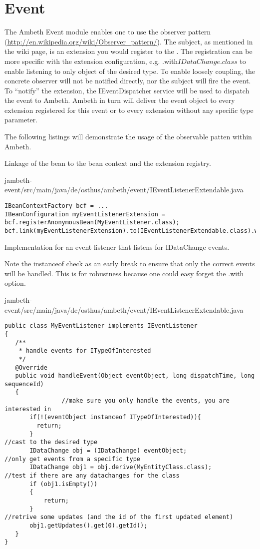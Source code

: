 \section{Event}
\label{module:Event}
\ClearAPI
\TODO
The Ambeth Event module enables one to use the observer pattern (\url{http://en.wikipedia.org/wiki/Observer_pattern/}). 
The subject, as mentioned in the wiki page, is an extension you would register to the . The registration can be more specific with the extension configuration, e.g. .with\(IDataChange.class\) to enable listening to only object of the desired type.
To enable loosely coupling, the concrete observer will not be notified directly, nor the subject will fire the event. To ``notify'' the extension, the IEventDispatcher service will be used to dispatch the event to Ambeth. Ambeth in turn will deliver the event object to every extension registered for this event or to every extension without any specific type parameter.

The following listings will demonstrate the usage of the observable patten within Ambeth.

Linkage of the bean to the bean context and the extension registry.

{jambeth-event/src/main/java/de/osthus/ambeth/event/IEventListenerExtendable.java}
\begin{lstlisting}[style=Java,caption={Example registration of an EventListener}]
IBeanContextFactory bcf = ...
IBeanConfiguration myEventListenerExtension = bcf.registerAnonymousBean(MyEventListener.class);
bcf.link(myEventListenerExtension).to(IEventListenerExtendable.class).with(IDataChange.class);
\end{lstlisting}

Implementation for an event listener that listens for IDataChange events.

Note the instanceof check as an early break to ensure that only the correct events will be handled. This is for robustness because one could easy forget the .with\(\) option.

{jambeth-event/src/main/java/de/osthus/ambeth/event/IEventListenerExtendable.java}
\begin{lstlisting}[style=Java,caption={}]
public class MyEventListener implements IEventListener
{
   /**
    * handle events for ITypeOfInterested
    */
   @Override
   public void handleEvent(Object eventObject, long dispatchTime, long sequenceId)
   {
				//make sure you only handle the events, you are interested in
       if(!(eventObject instanceof ITypeOfInterested)){
         return;
       }
//cast to the desired type
       IDataChange obj = (IDataChange) eventObject;
//only get events from a specific type
       IDataChange obj1 = obj.derive(MyEntityClass.class);
//test if there are any datachanges for the class
       if (obj1.isEmpty())
       {
           return;
       }
//retrive some updates (and the id of the first updated element)
       obj1.getUpdates().get(0).getId();
   }
}
\end{lstlisting}

